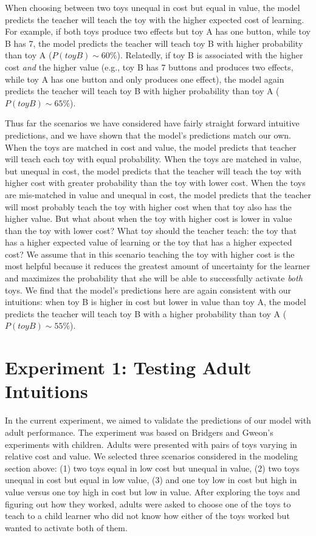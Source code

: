 \documentclass[10pt,letterpaper]{article}
\begin{document}
When choosing between two toys unequal in cost but equal in value, the model predicts the teacher will teach the toy with the higher expected cost of learning. For example, if both toys produce two effects but toy A has one button, while toy B has 7, the model predicts the teacher will teach toy B with higher probability than toy A ($P(toyB) \sim 60\%$). Relatedly, if toy B is associated with the higher cost \textit{and} the higher value (e.g., toy B has 7 buttons and produces two effects, while toy A has one button and only produces one effect), the model again predicts the teacher will teach toy B with higher probability than toy A ($P(toyB) \sim 65\%$).

Thus far the scenarios we have considered have fairly straight forward intuitive predictions, and we have shown that the model's predictions match our own. When the toys are matched in cost and value, the model predicts that teacher will teach each toy with equal probability. When the toys are matched in value, but unequal in cost, the model predicts that the teacher will teach the toy with higher cost with greater probability than the toy with lower cost. When the toys are mis-matched in value and unequal in cost, the model predicts that the teacher will most probably teach the toy with higher cost when that toy also has the higher value. But what about when the toy with higher cost is lower in value than the toy with lower cost? What toy should the teacher teach: the toy that has a higher expected value of learning or the toy that has a higher expected cost? We assume that in this scenario teaching the toy with higher cost is the most helpful because it reduces the greatest amount of uncertainty for the learner and maximizes the probability that she will be able to successfully activate \textit{both} toys. We find that the model's predictions here are again consistent with our intuitions: when toy B is higher in cost but lower in value than toy A, the model predicts the teacher will teach toy B with a higher probability than toy A ($P(toyB) \sim 55\%$).

\section{Experiment 1: Testing Adult Intuitions}

In the current experiment, we aimed to validate the predictions of our model with adult performance. The experiment was based on Bridgers and Gweon's experiments with children. Adults were presented with pairs of toys varying in relative cost and value. We selected three scenarios considered in the modeling section above: (1) two toys equal in low cost but unequal in value, (2) two toys unequal in cost but equal in low value, (3) and one toy low in cost but high in value versus one toy high in cost but low in value. After exploring the toys and figuring out how they worked, adults were asked to choose one of the toys to teach to a child learner who did not know how either of the toys worked but wanted to activate both of them. 
\end{document}
